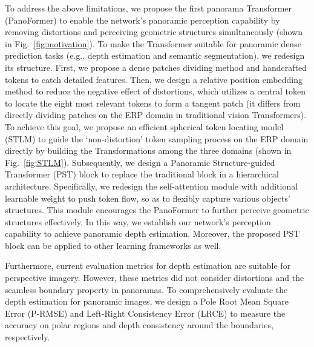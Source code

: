 \documentclass[runningheads]{llncs}
\begin{document}
To address the above limitations, we propose the first panorama Transformer (PanoFormer) to enable the network's panoramic perception capability by removing distortions and perceiving geometric structures simultaneously (shown in Fig.~\ref{fig:motivation}). To make the Transformer suitable for panoramic dense prediction tasks (e.g., depth estimation and semantic segmentation), we redesign its structure. First, we propose a dense patches dividing method and handcrafted tokens to catch detailed features. Then, we design a relative position embedding method to reduce the negative effect of distortions, which utilizes a central token to locate the eight most relevant tokens to form a tangent patch (it differs from directly dividing patches on the ERP domain in traditional vision Transformers). To achieve this goal, we propose an efficient spherical token locating model (STLM) to guide the `non-distortion' token sampling process on the ERP domain directly by building the Transformations among the three domains (shown in Fig.~\ref{fig:STLM}). Subsequently, we design a Panoramic Structure-guided Transformer (PST) block to replace the traditional block in a hierarchical architecture. Specifically, we redesign the self-attention module with additional learnable weight to push token flow, so as to flexibly capture various objects' structures. This module encourages the PanoFormer to further perceive geometric structures effectively. In this way, we establish our network's perception capability to achieve panoramic depth estimation. Moreover, the proposed PST block can be applied to other learning frameworks as well.
 
Furthermore, current evaluation metrics for depth estimation are suitable for perspective imagery. However, these metrics did not consider distortions and the seamless boundary property in panoramas. To comprehensively evaluate the depth estimation for panoramic images, we design a Pole Root Mean Square Error (P-RMSE) and Left-Right Consistency Error (LRCE) to measure the accuracy on polar regions and depth consistency around the boundaries, respectively.
 
\end{document}
